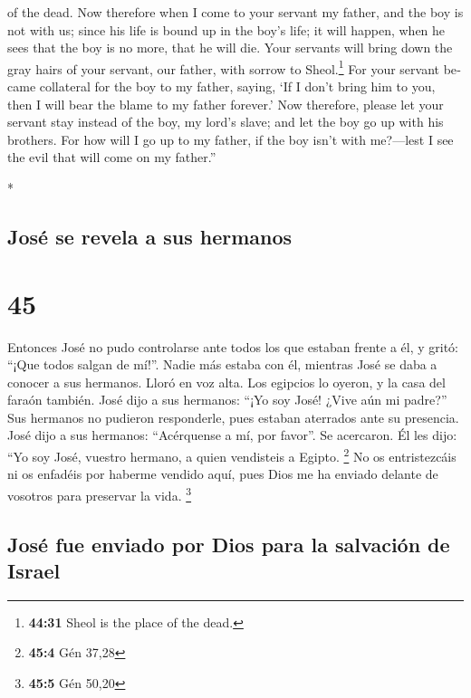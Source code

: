 \begin{paracol}{2}
\begin{otherlanguage}{english}
{  of the dead.}  Now therefore when I come to your
servant my father, and the boy is not with us; since his life is bound
up in the boy's life;  it will happen, when he sees that
the boy is no more, that he will die. Your servants will bring down the
gray hairs of your servant, our father, with sorrow to Sheol.\footnote{\textbf{44:31}
  Sheol is the place of the dead.}  For your servant
became collateral for the boy to my father, saying, `If I don't bring
him to you, then I will bear the blame to my father forever.'
 Now therefore, please let your servant stay instead of
the boy, my lord's slave; and let the boy go up with his brothers.
 For how will I go up to my father, if the boy isn't with
me?---lest I see the evil that will come on my father.''

\end{otherlanguage}

\switchcolumn[0]*

\hypertarget{josuxe9-se-revela-a-sus-hermanos}{%
\subsection{José se revela a sus
hermanos}\label{josuxe9-se-revela-a-sus-hermanos}}

\hypertarget{section-88}{%
\section{45}\label{section-88}}

 Entonces José no pudo controlarse ante todos los que
estaban frente a él, y gritó: ``¡Que todos salgan de mí!''. Nadie más
estaba con él, mientras José se daba a conocer a sus hermanos.
 Lloró en voz alta. Los egipcios lo oyeron, y la casa del
faraón también.  José dijo a sus hermanos: ``¡Yo soy José!
¿Vive aún mi padre?'' Sus hermanos no pudieron responderle, pues estaban
aterrados ante su presencia.  José dijo a sus hermanos:
``Acérquense a mí, por favor''. Se acercaron. Él les dijo: ``Yo soy
José, vuestro hermano, a quien vendisteis a Egipto. \footnote{\textbf{45:4}
  Gén 37,28}  No os entristezcáis ni os enfadéis por
haberme vendido aquí, pues Dios me ha enviado delante de vosotros para
preservar la vida. \footnote{\textbf{45:5} Gén 50,20}

\hypertarget{josuxe9-fue-enviado-por-dios-para-la-salvaciuxf3n-de-israel}{%
\subsection{José fue enviado por Dios para la salvación de
Israel}\label{josuxe9-fue-enviado-por-dios-para-la-salvaciuxf3n-de-israel}}


\end{paracol}
